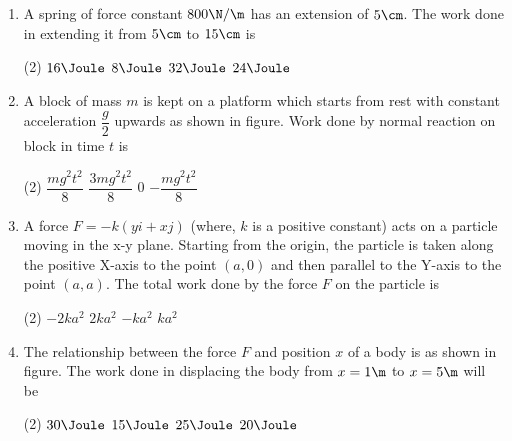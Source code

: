 \documentclass{article}
\begin{document}
\begin{enumerate}
\item A spring of force constant $800 \N/\m$ has an extension of $5 \cm$. The work done in extending it from $5 \cm$ to $15 \cm$ is
\begin{tasks}(2)
	\task $16\Joule$
	\task $8\Joule$\ans
	\task $32\Joule$
	\task $24\Joule$
\end{tasks}

\item A block of mass $m$ is kept on a platform which starts from rest with constant acceleration $\dfrac{g}{2}$ upwards as shown in figure. Work done by normal reaction on block in time $t$ is
\begin{center}
\end{center}
\begin{tasks}(2)
	\task $\dfrac{mg^2t^2}{8}$
	\task $\dfrac{3mg^2t^2}{8}$\ans
	\task $0$
	\task $-\dfrac{mg^2t^2}{8}$
\end{tasks}

\item A force $F=-k(yi+xj)$ (where, $k$ is a positive constant) acts on a particle moving in the x-y plane. Starting from the origin, the particle is taken along the positive X-axis to the point $(a,0)$ and then parallel to the Y-axis to the point $(a, a)$. The total work done by the force $F$ on the particle is
\begin{tasks}(2)
	\task $-2ka^2$
	\task $2ka^2$
	\task $-ka^2$\ans
	\task $ka^2$
\end{tasks}

\item The relationship between the force $F$ and position $x$ of a body is as shown in figure. The work done in displacing the body from $x = 1\m$ to $x = 5\m$ will be
\begin{center}
\end{center}
\begin{tasks}(2)
	\task $30\Joule$
	\task $15\Joule$\ans
	\task $25\Joule$
	\task $20\Joule$
\end{tasks}


\end{enumerate}
\end{document}
